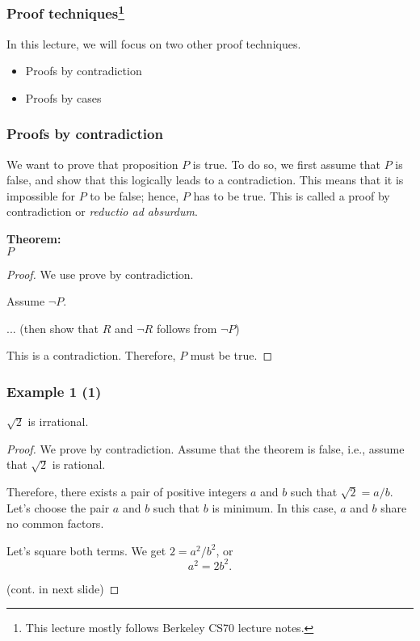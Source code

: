 

\begin{frame}\frametitle{Proof techniques\footnote{This lecture mostly follows Berkeley CS70 lecture notes.}}
  In this lecture, we will focus on two other proof techniques.
  \begin{itemize}
  \item Proofs by contradiction
  \item Proofs by cases
  \end{itemize}
\end{frame}

\begin{frame}\frametitle{Proofs by contradiction}
  We want to prove that proposition $P$ is true.  To do so, we first
  assume that $P$ is false, and show that this logically leads to a
  contradiction.  This means that it is impossible for $P$ to be
  false; hence, $P$ has to be true.  This is called a proof by
  contradiction or {\em reductio ad absurdum}.

  \begin{tcolorbox}[title=Direct proofs]
    {\bf Theorem:} \\
    $P$
    \begin{proof}
      We use prove by contradiction.
      
      Assume $\neg P$.
      
      ... (then show that $R$ and $\neg R$ follows from $\neg P$)

      This is a contradiction. Therefore, $P$ must be true.
    \end{proof}
  \end{tcolorbox}
\end{frame}

\begin{frame}\frametitle{Example 1 (1)}
  \begin{theorem}
    $\sqrt{2}$ is irrational.
  \end{theorem}
  \begin{proof}
    We prove by contradiction.  Assume that the theorem is false,
    i.e., assume that $\sqrt{2}$ is rational. \pause

    Therefore, there exists a pair of positive integers $a$ and $b$
    such that $\sqrt{2} = a/b$.  \pause Let's choose the pair $a$ and
    $b$ such that $b$ is minimum. In this case, $a$ and $b$ share no
    common factors. \pause

    Let's square both terms.  We get $2 = a^2/b^2$, or
    \[ a^2 = 2b^2. \]

    (cont. in next slide)
  \end{proof}
\end{frame}


